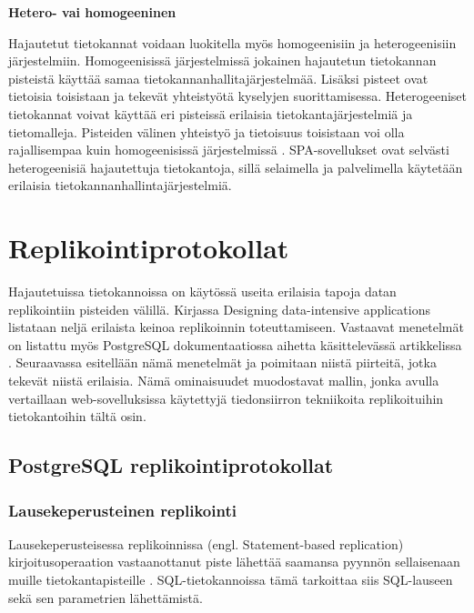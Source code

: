 \documentclass[finnish,twoside,censored,csm,sw-track-2018]{HYthesisML}
\begin{document}
\textbf{Hetero- vai homogeeninen}

Hajautetut tietokannat voidaan luokitella myös homogeenisiin ja heterogeenisiin järjestelmiin. Homogeenisissä järjestelmissä jokainen hajautetun tietokannan pisteistä käyttää samaa tietokannanhallitajärjestelmää. Lisäksi pisteet ovat tietoisia toisistaan ja tekevät yhteistyötä kyselyjen suorittamisessa. Heterogeeniset tietokannat voivat käyttää eri pisteissä erilaisia tietokantajärjestelmiä ja tietomalleja. Pisteiden välinen yhteistyö ja tietoisuus toisistaan voi olla rajallisempaa kuin homogeenisissä järjestelmissä \citep{DSC}. SPA-sovellukset ovat selvästi heterogeenisiä hajautettuja tietokantoja, sillä selaimella ja palvelimella käytetään erilaisia tietokannanhallintajärjestelmiä.

\chapter{Replikointiprotokollat}
\label{sec-protokolla-teoria}

Hajautetuissa tietokannoissa on käytössä useita erilaisia tapoja datan replikointiin pisteiden välillä. Kirjassa Designing data-intensive applications \citep{Kleppmann} listataan neljä erilaista keinoa replikoinnin toteuttamiseen. Vastaavat menetelmät on listattu myös PostgreSQL dokumentaatiossa aihetta käsittelevässä artikkelissa \citep{postgres-replication-solutions}. Seuraavassa esitellään nämä menetelmät ja poimitaan niistä piirteitä, jotka tekevät niistä erilaisia. Nämä ominaisuudet muodostavat mallin, jonka avulla vertaillaan web-sovelluksissa käytettyjä tiedonsiirron tekniikoita replikoituihin tietokantoihin tältä osin.

\section{PostgreSQL replikointiprotokollat}

\subsection{Lausekeperusteinen replikointi}
\label{sec-statement-based-replication}

Lausekeperusteisessa replikoinnissa (engl. Statement-based replication) kirjoitusoperaation vastaanottanut piste lähettää saamansa pyynnön sellaisenaan muille tietokantapisteille \cite{Kleppmann}. SQL-tietokannoissa tämä tarkoittaa siis SQL-lauseen sekä sen parametrien lähettämistä.
\end{document}
